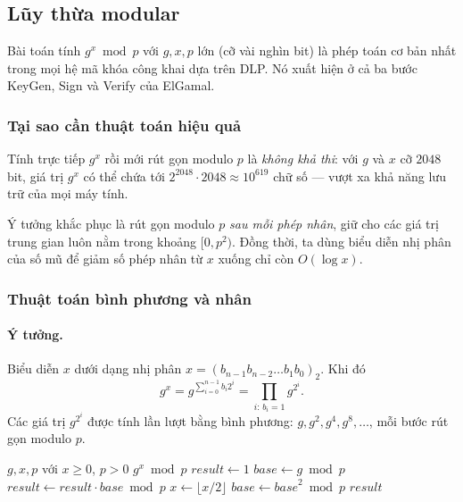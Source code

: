 \documentclass[12pt,a4paper]{report}
\theoremstyle{definition}
\theoremstyle{remark}
\begin{document}
\subsection{Lũy thừa modular}
\label{subsec:modexp}

Bài toán tính $g^x \bmod p$ với $g, x, p$ lớn (cỡ vài nghìn bit) là phép toán cơ bản nhất trong mọi hệ mã khóa công khai dựa trên DLP. Nó xuất hiện ở cả ba bước KeyGen, Sign và Verify của ElGamal.

\subsubsection{Tại sao cần thuật toán hiệu quả}

Tính trực tiếp $g^x$ rồi mới rút gọn modulo $p$ là \emph{không khả thi}: với $g$ và $x$ cỡ $2048$ bit, giá trị $g^x$ có thể chứa tới $2^{2048} \cdot 2048 \approx 10^{619}$ chữ số --- vượt xa khả năng lưu trữ của mọi máy tính.

Ý tưởng khắc phục là rút gọn modulo $p$ \emph{sau mỗi phép nhân}, giữ cho các giá trị trung gian luôn nằm trong khoảng $[0, p^2)$. Đồng thời, ta dùng biểu diễn nhị phân của số mũ để giảm số phép nhân từ $x$ xuống chỉ còn $O(\log x)$.

\subsubsection{Thuật toán bình phương và nhân}

\paragraph{Ý tưởng.} Biểu diễn $x$ dưới dạng nhị phân $x = (b_{n-1} b_{n-2} \ldots b_1 b_0)_2$. Khi đó
\[
g^x = g^{\sum_{i=0}^{n-1} b_i 2^i} = \prod_{i:\, b_i = 1} g^{2^i}.
\]
Các giá trị $g^{2^i}$ được tính lần lượt bằng bình phương: $g, g^2, g^4, g^8, \ldots$, mỗi bước rút gọn modulo $p$.

\begin{algorithm}[H]
\caption{Lũy thừa modular --- bình phương và nhân}
\label{alg:modexp}
\begin{algorithmic}[1]
\Require $g, x, p$ với $x \geq 0$, $p > 0$
\Ensure $g^x \bmod p$
\State $\mathit{result} \gets 1$
\State $\mathit{base} \gets g \bmod p$
        \State $\mathit{result} \gets \mathit{result} \cdot \mathit{base} \bmod p$
    \EndIf
    \State $x \gets \lfloor x / 2 \rfloor$
    \State $\mathit{base} \gets \mathit{base}^2 \bmod p$
\EndWhile
\State \Return $\mathit{result}$
\end{algorithmic}
\end{algorithm}
\end{document}
